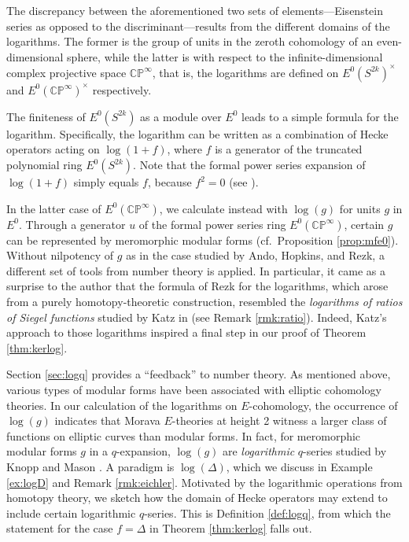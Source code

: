 \documentclass{gtpart}
\theoremstyle{definition}
\theoremstyle{remark}
\newcommand{\mb}[1]{\mathbb{#1}}
\newcommand{\BC}{{\mb C}}
\newcommand{\BP}{{\mb P}}
\renewcommand{\D}{\Delta}
\renewcommand{\=}{\approx}
\renewcommand{\-}{\sim}
\numberwithin{equation}{section}
\begin{document}
The discrepancy between the aforementioned two sets of elements---Eisenstein 
series as opposed to the discriminant---results from the different domains of 
the logarithms.  The former is the group of units in the zeroth cohomology of an 
even-dimensional sphere, while the latter is with respect to the 
infinite-dimensional complex projective space $\BC\BP^\infty$, that is, the 
logarithms are defined on $E^0(S^{2 k})^\times$ and $E^0(\BC\BP^\infty)^\times$ 
respectively.  

The finiteness of $E^0(S^{2 k})$ as a module over $E^0$ leads to a simple 
formula for the logarithm.  Specifically, the logarithm can be written as a 
combination of Hecke operators acting on $\log (1 + f)$, where $f$ is a 
generator of the truncated polynomial ring $E^0(S^{2 k})$.  Note that the formal 
power series expansion of $\log (1 + f)$ simply equals $f$, because $f^2 = 0$ 
(see \cite[Proposition 4.8 and Example 4.9]{koandtmf}).  

In the latter case of $E^0(\BC\BP^\infty)$, we calculate instead with $\log(g)$ 
for units $g$ in $E^0$.  Through a generator $u$ of the formal power series ring 
$E^0(\BC\BP^\infty)$, certain $g$ can be represented by meromorphic modular 
forms (cf.~Proposition \ref{prop:mfe0}).  Without nilpotency of $g$ as in the 
case studied by Ando, Hopkins, and Rezk, a different set of tools from number 
theory is applied.  In particular, it came as a surprise to the author that the 
formula of Rezk for the logarithms, which arose from a purely homotopy-theoretic 
construction, resembled the {\em logarithms of ratios of Siegel functions} 
studied by Katz in \cite[Section 10.1]{padicinterp} (see Remark 
\ref{rmk:ratio}).  Indeed, Katz's approach to those logarithms inspired a final 
step in our proof of Theorem \ref{thm:kerlog}.  

Section \ref{sec:logq} provides a ``feedback'' to number theory.  As mentioned 
above, various types of modular forms have been associated with elliptic 
cohomology theories.  In our calculation of the logarithms on $E$-cohomology, 
the occurrence of $\log(g)$ indicates that Morava $E$-theories at height 2 
witness a larger class of functions on elliptic curves than modular forms.  In 
fact, for meromorphic modular forms $g$ in a $q$-expansion, $\log(g)$ are {\em 
logarithmic} $q$-series studied by Knopp and Mason \cite{KnoppMason}.  A 
paradigm is $\log(\D)$, which we discuss in Example \ref{ex:logD} and Remark 
\ref{rmk:eichler}.  Motivated by the logarithmic operations from homotopy 
theory, we sketch how the domain of Hecke operators may extend to include 
certain logarithmic $q$-series.  This is Definition \ref{def:logq}, from which 
the statement for the case $f = \D$ in Theorem \ref{thm:kerlog} falls out.  
\end{document}
